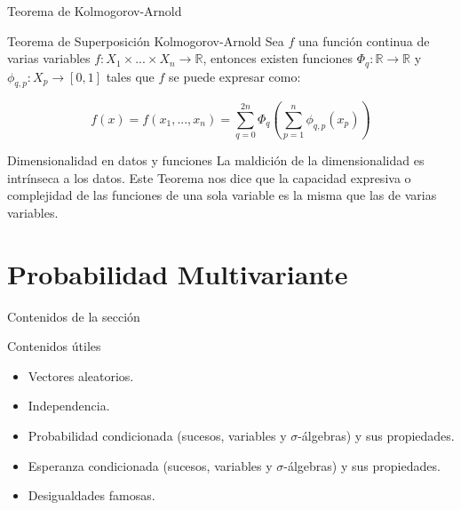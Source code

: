 \documentclass[10pt]{beamer}
\begin{document}
\begin{frame}[fragile]{Teorema de Kolmogorov-Arnold}
\vspace{10px}
\pause
{}

\begin{block}{Teorema de Superposición Kolmogorov-Arnold}
	Sea $f$ una función continua de varias variables $f:X_1 \times ... \times X_n \rightarrow \mathbb{R}$, entonces existen funciones $\Phi_q : \mathbb{R}\rightarrow \mathbb{R}$ y $\phi_{q,p} : X_p \rightarrow [0,1]$ tales que $f$ se puede expresar como:
	
	$$f(x) = f(x_1, ..., x_n) = \sum_{q=0}^{2n}\Phi_q ( \sum_{p=1}^{n}\phi_{q,p}(x_p))$$
\end{block}

\pause

\begin{alertblock}{Dimensionalidad en datos y funciones}
	La maldición de la dimensionalidad es intrínseca a los datos. Este Teorema nos dice que la capacidad expresiva o complejidad de las funciones de una sola variable es la misma que las de varias variables.
\end{alertblock}

\end{frame}

\section{Probabilidad Multivariante}

\begin{frame}[fragile]{Contenidos de la sección}
\vspace{10px}
\pause
{}

\begin{block}{Contenidos útiles}
	\begin{itemize}
		\item Vectores aleatorios.
		\pause
		\item Independencia.
		\pause
		\item Probabilidad condicionada (sucesos, variables y $\sigma$-álgebras) y sus propiedades.
		\pause
		\item Esperanza condicionada (sucesos, variables y $\sigma$-álgebras) y sus propiedades.
		\pause
		\item Desigualdades famosas.
	\end{itemize}
\end{block}

\end{frame}
\end{document}
